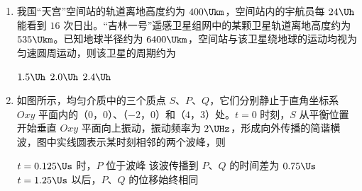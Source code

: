 \documentclass[\gkver]{gaokaozhenti}
\begin{document}
\begin{enumerate}
{②}
{③}
{④}


\item
我国“天宫”空间站的轨道离地高度约为 $ 400 \Ukm $，空间站内的宇航员每 $ 24 \Uh $ 能看到 $ 16 $ 次日出。“吉林一号”遥感卫星组网中的某颗卫星轨道离地高度约为 $ 535 \Ukm $。已知地球半径约为 $ 6400 \Ukm $，空间站与该卫星绕地球的运动均视为匀速圆周运动，则该卫星的周期约为 


\fourchoices[answer=B]
{$ 1.0\Uh $}
{$ 1.5\Uh $}
{$ 2.0\Uh $}
{$ 2.4\Uh $}


\item
如图所示，均匀介质中的三个质点 $ S $、$ P $、$ Q $，它们分别静止于直角坐标系 $ Oxy $ 平面内的（$ 0 $，$ 0 $）、（$ - 2 $，$ 0 $）和（$ 4 $，$ 3 $）处。$ t =0 $ 时刻，$ S $ 从平衡位置开始垂直 $ Oxy $ 平面向上振动，振动频率为 $ 2 \UHz $，形成向外传播的简谐横波，图中实线圆表示某时刻相邻的两个波峰，则 
\onepicture[w=5.80cm, h=4.46cm]{}

{$ t =0.125 \Us $ 时，$ P $ 位于波峰}
{该波传播到 $ P $、$ Q $ 的时间差为 $ 0.75 \Us $}
{$ t =1.25 \Us $ 以后，$ P $、$ Q $ 的位移始终相同}


\end{enumerate}
\end{document}
